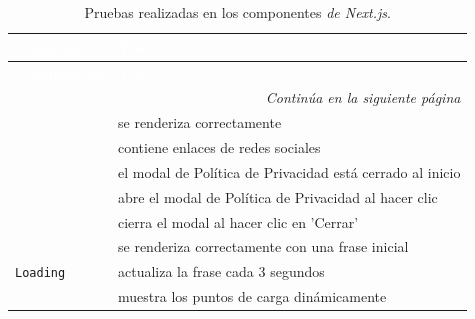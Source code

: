 \begin{longtable}{|p{5cm}|p{9cm}|}
  \caption{Pruebas realizadas en los componentes \textit{de Next.js}.} \label{tab:pruebas_componentes}                           \\

  \hline
  \rowcolor[HTML]{E6B8CE}
  \textbf{\textcolor{white}{Componente}}          & \textbf{\textcolor{white}{Test}}                                             \\ \hline
  \endfirsthead

  \hline
  \rowcolor[HTML]{E6B8CE}
  \textbf{\textcolor{white}{Componente}}          & \textbf{\textcolor{white}{Test}}                                             \\ \hline
  \endhead

  \hline \multicolumn{2}{|r|}{\textit{Continúa en la siguiente página}}                                                          \\ \hline
  \endfoot

  \hline
  \endlastfoot

  \multirow{5}{*}{\texttt{Footer}}                & se renderiza correctamente                                                   \\ \cline{2-2}
                                                  & contiene enlaces de redes sociales                                           \\ \cline{2-2}
                                                  & el modal de Política de Privacidad está cerrado al inicio                    \\ \cline{2-2}
                                                  & abre el modal de Política de Privacidad al hacer clic                        \\ \cline{2-2}
                                                  & cierra el modal al hacer clic en 'Cerrar'                                    \\ \hline

  \multirow{3}{*}{\texttt{Loading}}               & se renderiza correctamente con una frase inicial                             \\ \cline{2-2}
                                                  & actualiza la frase cada 3 segundos                                           \\ \cline{2-2}
                                                  & muestra los puntos de carga dinámicamente                                    \\ \hline


\end{longtable}

